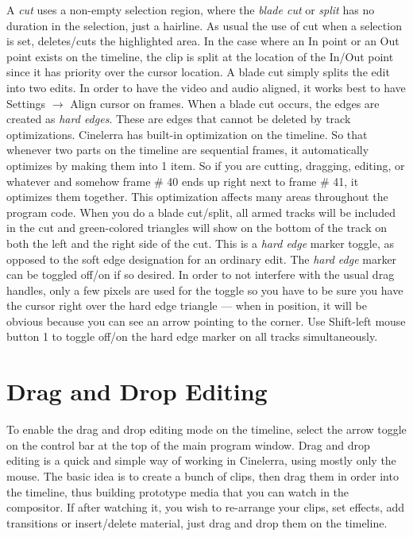  A \textit{cut} uses a non-empty selection region, where the \textit{blade cut} or \textit{split} has no duration in the selection, just a hairline.  As usual the use of cut when a selection is set, deletes/cuts the highlighted area.  In the case where an In point or an Out point exists on the timeline, the clip is split at the location of the In/Out point since it has priority over the cursor location.  A blade cut simply splits the edit into two edits.  In order to have the video and audio aligned, it works best to have Settings $\rightarrow$ Align cursor on frames.  When a blade cut occurs, the edges are created as \textit{hard edges}.  These are edges that cannot be deleted by track optimizations.
Cinelerra has built-in optimization on the timeline.  So that whenever two parts on the timeline are sequential frames, it automatically optimizes by making them into 1 item.  So if you are cutting, dragging, editing, or whatever and somehow frame \# 40 ends up right next to frame \# 41, it optimizes them together.  This optimization affects many areas throughout the program code.
When you do a blade cut/split, all armed tracks will be included in the cut and green-colored triangles will show on the bottom of the track on both the left and the right side of the cut.  This is a \textit{hard edge} marker toggle, as opposed to the soft edge designation for an ordinary edit.  The \textit{hard edge} marker can be toggled off/on if so desired.  In order to not interfere with the usual drag handles, only a few pixels are used for the toggle so you have to be sure you have the cursor right over the hard edge triangle  --- when in position, it will be obvious because you can see an arrow pointing to the corner.  Use Shift-left mouse button 1 to toggle off/on the hard edge marker on all tracks simultaneously.

\section{Drag and Drop Editing}%
\label{sec:drag_drop_editing}

To enable the drag and drop editing mode on the timeline, select the arrow toggle on the control bar at the top of the main program window.  Drag and drop editing is a quick and simple way of working in Cinelerra, using mostly only the mouse. The basic idea is to create a bunch of clips, then drag them in order into the timeline, thus building prototype media that you can watch in the compositor. If after watching it, you wish to re-arrange your clips, set effects, add transitions or insert/delete material, just drag and drop them on the timeline. 

